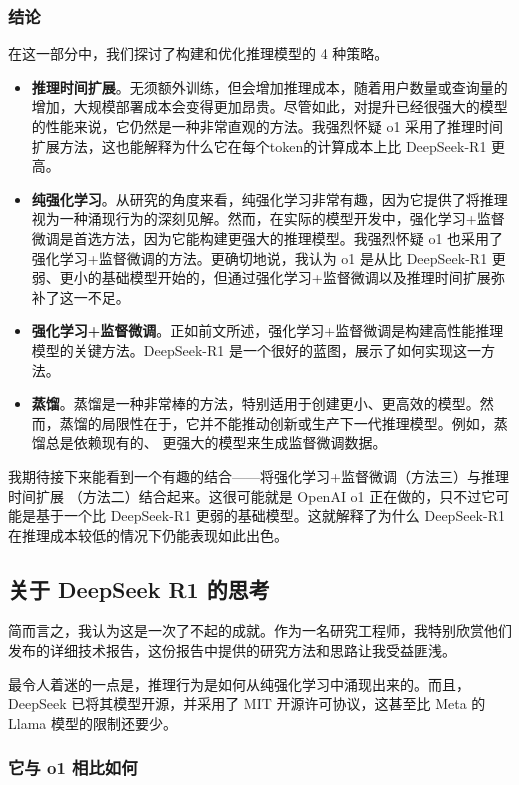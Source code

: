 \documentclass[lang=cn,newtx,10pt,scheme=chinese]{elegantbook}
\begin{document}
\subsubsection{结论}

在这一部分中，我们探讨了构建和优化推理模型的 4 种策略。

\begin{itemize}
\item \textbf{推理时间扩展}。无须额外训练，但会增加推理成本，随着用户数量或查询量的增加，大规模部署成本会变得更加昂贵。尽管如此，对提升已经很强大的模型的性能来说，它仍然是一种非常直观的方法。我强烈怀疑 o1 采用了推理时间扩展方法，这也能解释为什么它在每个token的计算成本上比 DeepSeek-R1 更高。
\item \textbf{纯强化学习}。从研究的角度来看，纯强化学习非常有趣，因为它提供了将推理视为一种涌现行为的深刻见解。然而，在实际的模型开发中，强化学习+监督微调是首选方法，因为它能构建更强大的推理模型。我强烈怀疑 o1 也采用了强化学习+监督微调的方法。更确切地说，我认为 o1 是从比 DeepSeek-R1 更弱、更小的基础模型开始的，但通过强化学习+监督微调以及推理时间扩展弥补了这一不足。
\item \textbf{强化学习+监督微调}。正如前文所述，强化学习+监督微调是构建高性能推理模型的关键方法。DeepSeek-R1 是一个很好的蓝图，展示了如何实现这一方法。
\item \textbf{蒸馏}。蒸馏是一种非常棒的方法，特别适用于创建更小、更高效的模型。然而，蒸馏的局限性在于，它并不能推动创新或生产下一代推理模型。例如，蒸馏总是依赖现有的、 更强大的模型来生成监督微调数据。
\end{itemize}

我期待接下来能看到一个有趣的结合——将强化学习+监督微调（方法三）与推理时间扩展 （方法二）结合起来。这很可能就是 OpenAI o1 正在做的，只不过它可能是基于一个比 DeepSeek-R1 更弱的基础模型。这就解释了为什么 DeepSeek-R1 在推理成本较低的情况下仍能表现如此出色。

\subsection{关于 DeepSeek R1 的思考}

简而言之，我认为这是一次了不起的成就。作为一名研究工程师，我特别欣赏他们发布的详细技术报告，这份报告中提供的研究方法和思路让我受益匪浅。

最令人着迷的一点是，推理行为是如何从纯强化学习中涌现出来的。而且，DeepSeek 已将其模型开源，并采用了 MIT 开源许可协议，这甚至比 Meta 的 Llama 模型的限制还要少。

\subsubsection{它与 o1 相比如何}
\end{document}
